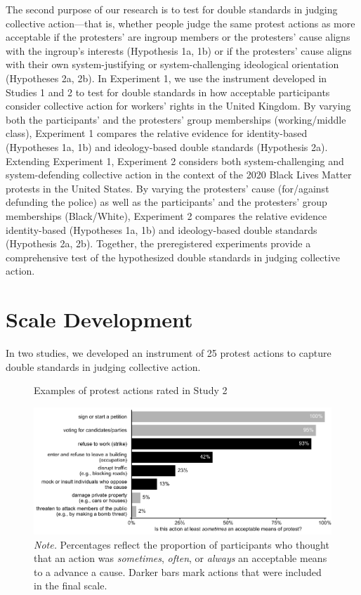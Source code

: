 \documentclass[twocolumn, 11pt, letterpaper]{article}
\begin{document}
The second purpose of our research is to test for double standards in
judging collective action---that is, whether people judge the same
protest actions as more acceptable if the protesters' are ingroup
members or the protesters' cause aligns with the ingroup's interests
(Hypothesis 1a, 1b) or if the protesters' cause aligns with their own
system-justifying or system-challenging ideological orientation
(Hypotheses 2a, 2b). In Experiment 1, we use the instrument developed in
Studies 1 and 2 to test for double standards in how acceptable
participants consider collective action for workers' rights in the
United Kingdom. By varying both the participants' and the protesters'
group memberships (working/middle class), Experiment 1 compares the
relative evidence for identity-based (Hypotheses 1a, 1b) and
ideology-based double standards (Hypothesis 2a). Extending Experiment 1,
Experiment 2 considers both system-challenging and system-defending
collective action in the context of the 2020 Black Lives Matter protests
in the United States. By varying the protesters' cause (for/against
defunding the police) as well as the participants' and the protesters'
group memberships (Black/White), Experiment 2 compares the relative
evidence identity-based (Hypotheses 1a, 1b) and ideology-based double
standards (Hypothesis 2a, 2b). Together, the preregistered experiments
provide a comprehensive test of the hypothesized double standards in
judging collective action.

\hypertarget{scale-development}{%
\section{Scale Development}\label{scale-development}}

In two studies, we developed an instrument of 25 protest actions to
capture double standards in judging collective action.

\begin{figure}[!t]
\centering
\caption{Examples of protest actions rated in Study 2}
\includegraphics[scale=1]{../Scale Development/figures/figure-2}
\caption*{\textit{Note.} Percentages reflect the proportion of participants who thought that an action was \textit{sometimes}, \textit{often}, or \textit{always} an acceptable means to a advance a cause. Darker bars mark actions that were included in the final scale.}
\label{fig:f2}
\end{figure}
\end{document}
